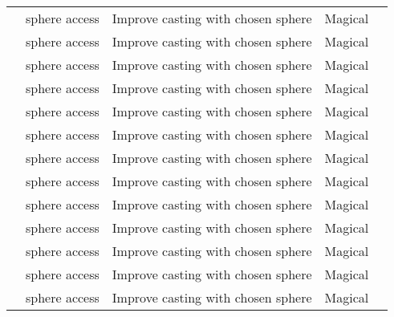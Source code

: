 \begin{longtabuwrapper}
\begin{longtabu}{>{\lcol}p{11em} >{\lcol}p{15em} >{\lcol}X >{\lcol}p{8em} >{\lcol}p{3em}}
               &  sphere access       & Improve casting with chosen sphere & Magical &        \\
           &  sphere access   & Improve casting with chosen sphere & Magical &    \\
            &  sphere access    & Improve casting with chosen sphere & Magical &     \\
             &  sphere access     & Improve casting with chosen sphere & Magical &      \\
         &  sphere access & Improve casting with chosen sphere & Magical &  \\
          &  sphere access  & Improve casting with chosen sphere & Magical &   \\
               &  sphere access       & Improve casting with chosen sphere & Magical &        \\
           &  sphere access   & Improve casting with chosen sphere & Magical &    \\
            &  sphere access    & Improve casting with chosen sphere & Magical &     \\
            &  sphere access    & Improve casting with chosen sphere & Magical &     \\
           &  sphere access   & Improve casting with chosen sphere & Magical &    \\
                 &  sphere access         & Improve casting with chosen sphere & Magical &          \\
               &  sphere access       & Improve casting with chosen sphere & Magical &        \\

\end{longtabu}
\end{longtabuwrapper}
